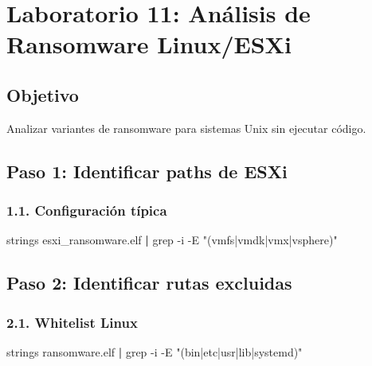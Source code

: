 \documentclass[
  letterpaper,
]{report}
\newenvironment{Shaded}{\begin{snugshade}}{\end{snugshade}}
\newcommand{\AttributeTok}[1]{\textcolor[rgb]{0.40,0.45,0.13}{#1}}
\newcommand{\FunctionTok}[1]{\textcolor[rgb]{0.28,0.35,0.67}{#1}}
\newcommand{\KeywordTok}[1]{\textcolor[rgb]{0.00,0.23,0.31}{\textbf{#1}}}
\newcommand{\NormalTok}[1]{\textcolor[rgb]{0.00,0.23,0.31}{#1}}
\newcommand{\StringTok}[1]{\textcolor[rgb]{0.13,0.47,0.30}{#1}}
\begin{document}
\chapter{Laboratorio 11: Análisis de Ransomware
Linux/ESXi}\label{laboratorio-11-anuxe1lisis-de-ransomware-linuxesxi-1}

\section{Objetivo}\label{objetivo-10}

Analizar variantes de ransomware para sistemas Unix sin ejecutar código.

\section{Paso 1: Identificar paths de
ESXi}\label{paso-1-identificar-paths-de-esxi}

\subsection{1.1. Configuración típica}\label{configuraciuxf3n-tuxedpica}

\begin{Shaded}
\begin{Highlighting}[]
\FunctionTok{strings}\NormalTok{ esxi\_ransomware.elf }\KeywordTok{|} \FunctionTok{grep} \AttributeTok{{-}i} \AttributeTok{{-}E} \StringTok{"(vmfs|vmdk|vmx|vsphere)"}
\end{Highlighting}
\end{Shaded}

\section{Paso 2: Identificar rutas
excluidas}\label{paso-2-identificar-rutas-excluidas}

\subsection{2.1. Whitelist Linux}\label{whitelist-linux}

\begin{Shaded}
\begin{Highlighting}[]
\FunctionTok{strings}\NormalTok{ ransomware.elf }\KeywordTok{|} \FunctionTok{grep} \AttributeTok{{-}i} \AttributeTok{{-}E} \StringTok{"(bin|etc|usr|lib|systemd)"}
\end{Highlighting}
\end{Shaded}
\end{document}
